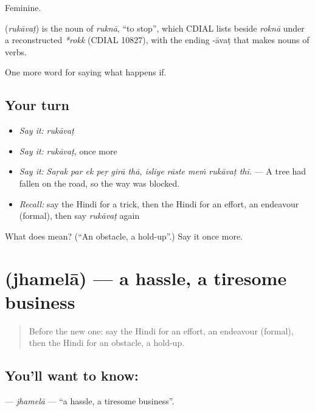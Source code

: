 Feminine.

\begin{cousinweb}
\textbf{} (\emph{rukāvaṭ}) is the noun of \emph{ruknā}, \textquotedblleft{}to stop\textquotedblright{}, which CDIAL lists beside \emph{roknā} under a reconstructed \emph{*rokk} (CDIAL 10827), with the ending -āvaṭ that makes nouns of verbs.
\end{cousinweb}

\begin{grammarlens}[title={What you've built}]
One more word for saying what happens if.
\end{grammarlens}

\subsection*{Your turn}
\begin{itemize}
\raggedright
  \item \emph{Say it:} \emph{rukāvaṭ}
  \item \emph{Say it:} \emph{rukāvaṭ}, once more
  \item \emph{Say it:} \emph{Saṛak par ek peṛ girā thā, isliye rāste meṁ rukāvaṭ thī.} — A tree had fallen on the road, so the way was blocked.
  \item \emph{Recall:} say the Hindi for a trick, then the Hindi for an effort, an endeavour (formal), then say \emph{rukāvaṭ} again
\end{itemize}

\begin{tcolorbox}[breakable,colback=teal!4,colframe=teal!35!black,title={Before you move on}]
What does  mean? (\textquotedblleft{}An obstacle, a hold-up\textquotedblright{}.) Say it once more.
\end{tcolorbox}
\section[\texorpdfstring{\hi{झमेला} (jhamelā)}{झमेला (jhamelā)}]{ (jhamelā) — a hassle, a tiresome business}

\label{lesson:HI-C541-jhamela}



\begin{quote}
Before the new one: say the Hindi for an effort, an endeavour (formal), then the Hindi for an obstacle, a hold-up.
\end{quote}

\subsection*{You'll want to know: }
\textbf{} — \emph{jhamelā} — \textquotedblleft{}a hassle, a tiresome business\textquotedblright{}.

